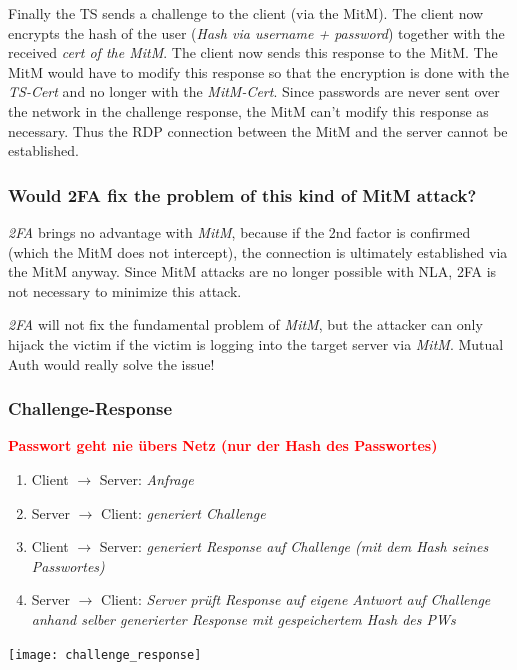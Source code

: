 Finally the TS sends a challenge to the client (via the MitM). The client now encrypts the hash of the user (\textit{Hash via username + password}) together with the received \textit{cert of the MitM}. The client now sends this response to the MitM. The MitM would have to modify this response so that the encryption is done with the \textit{TS-Cert} and no longer with the \textit{MitM-Cert}. Since passwords are never sent over the network in the challenge response, the MitM can't modify this response as necessary. Thus the RDP connection between the MitM and the server cannot be established.

\subsubsection{Would 2FA fix the problem of this kind of MitM attack?}
\textit{2FA} brings no advantage with \textit{MitM}, because if the 2nd factor is confirmed (which the MitM does not intercept), the connection is ultimately established via the MitM anyway. Since MitM attacks are no longer possible with NLA, 2FA is not necessary to minimize this attack.

\textit{2FA} will not fix the fundamental problem of \textit{MitM}, but the attacker can only hijack the victim if the victim is logging into the target server via \textit{MitM}. Mutual Auth would really solve the issue!

\subsubsection{Challenge-Response}
\textcolor{red}{\textbf{Passwort geht nie übers Netz (nur der Hash des Passwortes)}}\\

\begin{minipage}{0.45\linewidth}
    \begin{enumerate}
        \item Client $\rightarrow$ Server: \textit{Anfrage}
        \item Server $\rightarrow$ Client: \textit{generiert Challenge}
        \item Client $\rightarrow$ Server: \textit{generiert Response auf Challenge (mit dem Hash seines Passwortes)}
        \item Server $\rightarrow$ Client: \textit{Server prüft Response auf eigene Antwort auf Challenge anhand selber generierter Response mit gespeichertem Hash des PWs}
    \end{enumerate}
\end{minipage}
\begin{minipage}{0.5\linewidth}
    \begin{center}
        \texttt{[image: challenge\_response]}
        \vspace{-8pt}
    \end{center}
\end{minipage}

